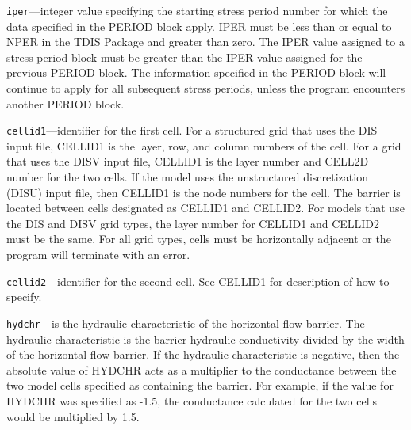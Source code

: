 \begin{description}
\item \texttt{iper}---integer value specifying the starting stress period number for which the data specified in the PERIOD block apply.  IPER must be less than or equal to NPER in the TDIS Package and greater than zero.  The IPER value assigned to a stress period block must be greater than the IPER value assigned for the previous PERIOD block.  The information specified in the PERIOD block will continue to apply for all subsequent stress periods, unless the program encounters another PERIOD block.

\item \texttt{cellid1}---identifier for the first cell.  For a structured grid that uses the DIS input file, CELLID1 is the layer, row, and column numbers of the cell.   For a grid that uses the DISV input file, CELLID1 is the layer number and CELL2D number for the two cells.  If the model uses the unstructured discretization (DISU) input file, then CELLID1 is the node numbers for the cell.  The barrier is located between cells designated as CELLID1 and CELLID2.  For models that use the DIS and DISV grid types, the layer number for CELLID1 and CELLID2 must be the same.  For all grid types, cells must be horizontally adjacent or the program will terminate with an error.

\item \texttt{cellid2}---identifier for the second cell. See CELLID1 for description of how to specify.

\item \texttt{hydchr}---is the hydraulic characteristic of the horizontal-flow barrier. The hydraulic characteristic is the barrier hydraulic conductivity divided by the width of the horizontal-flow barrier. If the hydraulic characteristic is negative, then the absolute value of HYDCHR acts as a multiplier to the conductance between the two model cells specified as containing the barrier. For example, if the value for HYDCHR was specified as -1.5, the conductance calculated for the two cells would be multiplied by 1.5.

\end{description}

